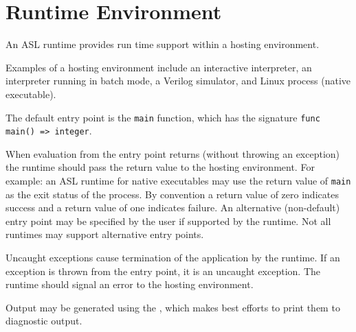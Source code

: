 \chapter{Runtime Environment\label{chap:RuntimeEnvironment}}

An ASL runtime provides run time support within a hosting environment.

Examples of a hosting environment include an interactive interpreter, an interpreter running in batch mode, a
Verilog simulator, and  Linux process (native executable).

The default entry point is the \texttt{main} function, which has the signature
\verb|func main() => integer|.

When evaluation from the entry point returns (without throwing an exception)
the runtime should pass the return value to the hosting environment.
%
For example: an ASL runtime for native executables may use the return value
of \texttt{main} as the exit status of the process.
%
By convention a return value of zero indicates success and a return value of
one indicates failure.
%
An alternative (non-default) entry point may be specified by the user if
supported by the runtime. Not all runtimes may support alternative entry points.

Uncaught exceptions cause termination of the application by the runtime.
If an exception is thrown from the entry point, it is an uncaught exception.
The runtime should signal an error to the hosting environment.

Output may be generated using the \printstatementterm, which makes
best efforts to print them to diagnostic output.

